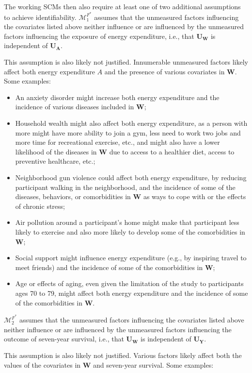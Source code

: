 \documentclass{article}\usepackage[]{graphicx}\usepackage[]{xcolor}
\begin{document}
\begin{enumerate}[label=\textbf{\arabic*.}]
\begin{enumerate}[label=\textbf{(\alph*)}]
The working SCMs then also require at least one of two additional assumptions to achieve identifiability. $\mathcal{M}^{F^*}_1$ assumes that the unmeasured factors influencing the covariates listed above neither influence or are influenced by the unmeasured factors influencing the exposure of energy expenditure, i.e., that $\bm{U_W}$ is independent of $\bm{U_A}$.

This assumption is also likely not justified. Innumerable unmeasured factors likely affect both energy expenditure $A$ and the presence of various covariates in $\bm{W}$. Some examples:

\begin{itemize}
  \item An anxiety disorder might increase both energy expenditure and the incidence of various diseases included in $\bm{W}$;
  \item Household wealth might also affect both energy expenditure, as a person with more might have more ability to join a gym, less need to work two jobs and more time for recreational exercise, etc., and might also have a lower likelihood of the diseases in $\bm{W}$ due to access to a healthier diet, access to preventive healthcare, etc.; 
  \item Neighborhood gun violence could affect both energy expenditure, by reducing participant walking in the neighborhood, and the incidence of some of the diseases, behaviors, or comorbidities in $\bm{W}$ as ways to cope with or the effects of chronic stress;
  \item Air pollution around a participant's home might make that participant less likely to exercise and also more likely to develop some of the comorbidities in $\bm{W}$;
  \item Social support might influence energy expenditure (e.g., by inspiring travel to meet friends) and the incidence of some of the comorbidities in $\bm{W}$;
  \item Age or effects of aging, even given the limitation of the study to participants ages 70 to 79, might affect both energy expenditure and the incidence of some of the comorbidities in $\bm{W}$.
\end{itemize}

$\mathcal{M}^{F^*}_2$ assumes that the unmeasured factors influencing the covariates listed above neither influence or are influenced by the unmeasured factors influencing the outcome of seven-year survival, i.e., that $\bm{U_W}$ is independent of $\bm{U_Y}$.

This assumption is also likely not justified. Various factors likely affect both the values of the covariates in $\bm{W}$ and seven-year survival. Some examples:


\end{enumerate}
\end{enumerate}
\end{document}
